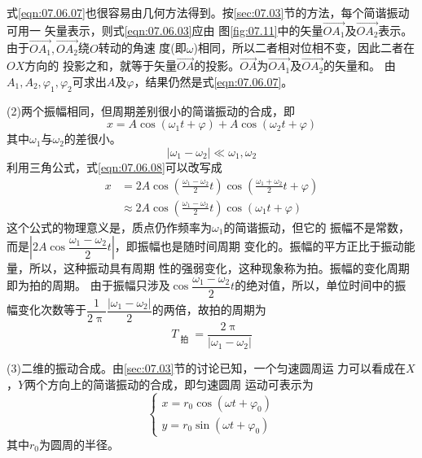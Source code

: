 式\eqref{eqn:07.06.07}也很容易由几何方法得到。按\ref{sec:07.03}节的方法，每个简谐振动可用一
矢量表示，则式\eqref{eqn:07.06.03}应由
图\ref{fig:07.11}中的矢量$ \vec{OA_1} $及$ \vec{OA_2} $表示。由于$ \vec{ O A _ { 1 } } , \vec{ O A _ { 2 } } $绕$ O $转动的角速
度(即$ \omega $)相同，所以二者相对位相不变，因此二者在$ OX $方向的
投影之和，就等于矢量$\vec{OA}$的投影。$ \vec{OA} $为$\vec{OA_1}$及$\vec{OA_2}$的矢量和。
由$ A _ { 1 } , A _ { 2 } ,\varphi_{ 1 },\varphi_{ 2 }$可求出$ A $及$\varphi$，结果仍然是式\eqref{eqn:07.06.07}。

(2)两个振幅相同，但周期差别很小的简谐振动的合成，即
\begin{equation}\label{eqn:07.06.08}
  x = A \cos \left( \omega _ { 1 } t + \varphi \right) + A \cos \left( \omega _ { 2 } t + \varphi \right)
\end{equation}
其中$\omega_{ 1 }$与$\omega_{ 2 }$的差很小。
\begin{equation*}
  \left| \omega _ { 1 } - \omega _ { 2 } \right| \ll \omega _ { 1 } , \omega _ { 2 }
\end{equation*}
利用三角公式，式\eqref{eqn:07.06.08}可以改写成
\begin{equation*}
  \begin{split}
    x &= 2 A \cos \left( \frac { \omega _ { 1 } - \omega _ { 2 } } { 2 } t \right) \cos \left( \frac { \omega _ { 1 } + \omega _ { 2 } } { 2 } t + \varphi \right) \\
    & \approx 2 A \cos \left( \frac { \omega _ { 1 } - \omega _ { 2 } } { 2 } t \right) \cos \left( \omega _ { 1 } t + \varphi \right)
  \end{split}
\end{equation*}
这个公式的物理意义是，质点仍作频率为$\omega_{ 1 }$的简谐振动，但它的
振幅不是常数，而是$ \left| 2 A \cos \dfrac { \omega _ { 1 } - \omega _ { 2 } } { 2 } t \right| $，即振幅也是随时间周期
变化的。振幅的平方正比于振动能量，所以，这种振动具有周期
性的强弱变化，这种现象称为拍。振幅的变化周期即为拍的周期。
由于振幅只涉及$ \cos \dfrac { \omega _ { 1 } - \omega _ { 2 } } { 2 } t $的绝对值，所以，单位时间中的振
幅变化次数等于$ \dfrac { 1 } { 2 \uppi } \dfrac { \left| \omega _ { 1 } - \omega _ { 2 } \right| } { 2 } $的两倍，故拍的周期为
\begin{equation*}
  T _ { \text { 拍 } } = \frac { 2 \uppi } { \left| \omega _ { 1 } - \omega _ { 2 } \right| }
\end{equation*}

(3)二维的振动合成。由\ref{sec:07.03}节的讨论已知，一个匀速圆周运
力可以看成在$ X $，$ Y $两个方向上的简谐振动的合成，即匀速圆周
运动可表示为
\begin{equation}\label{eqn:07.06.09}
  \begin{cases}
    x = r _ { 0 } \cos \left( \omega t + \varphi _ { 0 } \right) \\
    y = r _ { 0 } \sin \left( \omega t + \varphi _ { 0 } \right)
  \end{cases}
\end{equation}
其中$ r _ { 0 } $为圆周的半径。

